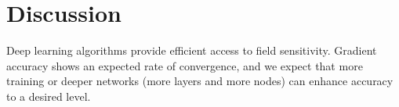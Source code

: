 \documentclass{jfm}
\begin{document}
\section{Discussion}
Deep learning algorithms provide efficient access to field sensitivity. Gradient accuracy shows an expected rate of convergence, and we expect that more training or deeper networks (more layers and more nodes) can enhance accuracy to a desired level.




\end{document}
